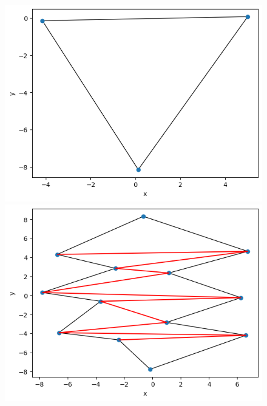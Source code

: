 \documentclass[11pt]{scrartcl}
\begin{document}
    \begin{figure}[H]
        \centering
        \begin{minipage}{0.45\linewidth}
          \centering
          \includegraphics[width=1\linewidth]{3_7.png}
          \caption{}
        \end{minipage}
        \begin{minipage}{0.45\linewidth}
          \centering
          \includegraphics[width=1\linewidth]{3_8.png}
          \caption{}
        \end{minipage}
    \end{figure}
\end{document}

